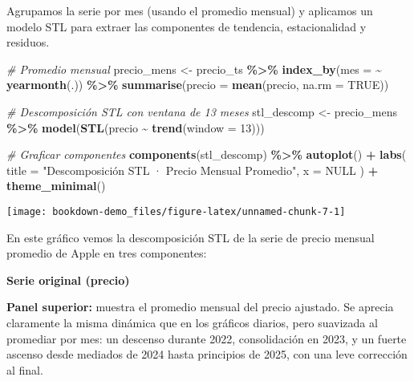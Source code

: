 \documentclass[
  11pt,
]{book}
\newenvironment{Shaded}{\begin{snugshade}}{\end{snugshade}}
\newcommand{\AttributeTok}[1]{\textcolor[rgb]{0.13,0.29,0.53}{#1}}
\newcommand{\CommentTok}[1]{\textcolor[rgb]{0.56,0.35,0.01}{\textit{#1}}}
\newcommand{\ConstantTok}[1]{\textcolor[rgb]{0.56,0.35,0.01}{#1}}
\newcommand{\DecValTok}[1]{\textcolor[rgb]{0.00,0.00,0.81}{#1}}
\newcommand{\FunctionTok}[1]{\textcolor[rgb]{0.13,0.29,0.53}{\textbf{#1}}}
\newcommand{\NormalTok}[1]{#1}
\newcommand{\OtherTok}[1]{\textcolor[rgb]{0.56,0.35,0.01}{#1}}
\newcommand{\SpecialCharTok}[1]{\textcolor[rgb]{0.81,0.36,0.00}{\textbf{#1}}}
\newcommand{\StringTok}[1]{\textcolor[rgb]{0.31,0.60,0.02}{#1}}
\begin{document}
Agrupamos la serie por mes (usando el promedio mensual) y aplicamos un modelo STL para extraer las componentes de tendencia, estacionalidad y residuos.

\begin{Shaded}
\begin{Highlighting}[]
\CommentTok{\# Promedio mensual}
\NormalTok{precio\_mens }\OtherTok{\textless{}{-}}\NormalTok{ precio\_ts }\SpecialCharTok{\%\textgreater{}\%}
  \FunctionTok{index\_by}\NormalTok{(}\AttributeTok{mes =} \SpecialCharTok{\textasciitilde{}} \FunctionTok{yearmonth}\NormalTok{(.)) }\SpecialCharTok{\%\textgreater{}\%}
  \FunctionTok{summarise}\NormalTok{(}\AttributeTok{precio =} \FunctionTok{mean}\NormalTok{(precio, }\AttributeTok{na.rm =} \ConstantTok{TRUE}\NormalTok{))}

\CommentTok{\# Descomposición STL con ventana de 13 meses}
\NormalTok{stl\_descomp }\OtherTok{\textless{}{-}}\NormalTok{ precio\_mens }\SpecialCharTok{\%\textgreater{}\%}
  \FunctionTok{model}\NormalTok{(}\FunctionTok{STL}\NormalTok{(precio }\SpecialCharTok{\textasciitilde{}} \FunctionTok{trend}\NormalTok{(}\AttributeTok{window =} \DecValTok{13}\NormalTok{)))}

\CommentTok{\# Graficar componentes}
\FunctionTok{components}\NormalTok{(stl\_descomp) }\SpecialCharTok{\%\textgreater{}\%}
  \FunctionTok{autoplot}\NormalTok{() }\SpecialCharTok{+}
  \FunctionTok{labs}\NormalTok{(}
    \AttributeTok{title =} \StringTok{"Descomposición STL · Precio Mensual Promedio"}\NormalTok{,}
    \AttributeTok{x     =} \ConstantTok{NULL}
\NormalTok{  ) }\SpecialCharTok{+}
  \FunctionTok{theme\_minimal}\NormalTok{()}
\end{Highlighting}
\end{Shaded}

\begin{center}\texttt{[image: bookdown-demo\_files/figure-latex/unnamed-chunk-7-1]} \end{center}

En este gráfico vemos la descomposición STL de la serie de precio mensual promedio de Apple en tres componentes:

\textbf{Serie original (precio)}

\textbf{Panel superior:} muestra el promedio mensual del precio ajustado. Se aprecia claramente la misma dinámica que en los gráficos diarios, pero suavizada al promediar por mes: un descenso durante 2022, consolidación en 2023, y un fuerte ascenso desde mediados de 2024 hasta principios de 2025, con una leve corrección al final.
\end{document}

